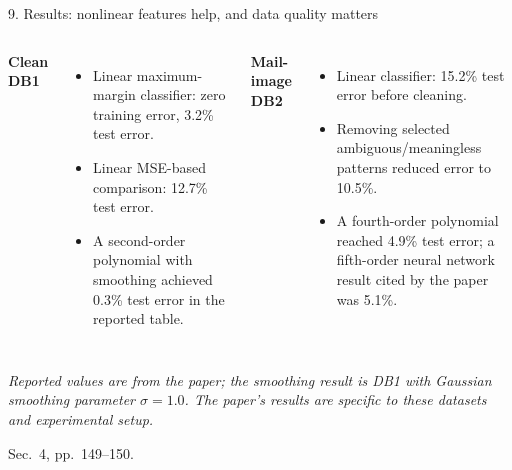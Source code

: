 \documentclass[10pt,compress]{beamer}
\newcommand{\defline}[1]{{\footnotesize\textcolor{aggiemaroon}{\textit{#1}}\par}}
\begin{document}
\begin{frame}{9. Results: nonlinear features help, and data quality matters}\footnotesize
\begin{columns}[T]
\textbf{Clean DB1}
\begin{itemize}\small
\item Linear maximum-margin classifier: zero training error, 3.2\% test error.
\item Linear MSE-based comparison: 12.7\% test error.
\item A second-order polynomial with smoothing achieved 0.3\% test error in the reported table.
\end{itemize}
\textbf{Mail-image DB2}
\begin{itemize}\small
\item Linear classifier: 15.2\% test error before cleaning.
\item Removing selected ambiguous/meaningless patterns reduced error to 10.5\%.
\item A fourth-order polynomial reached 4.9\% test error; a fifth-order neural network result cited by the paper was 5.1\%.
\end{itemize}
\end{columns}
\begin{center}
\end{center}
\defline{Reported values are from the paper; the smoothing result is DB1 with Gaussian smoothing parameter $\sigma=1.0$. The paper's results are specific to these datasets and experimental setup.}
{\scriptsize Sec.~4, pp.~149--150.}
\end{frame}
\end{document}
